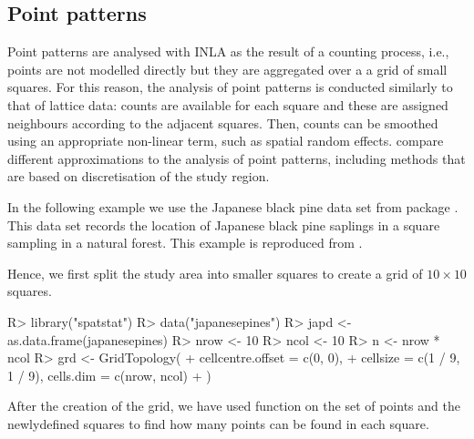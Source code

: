 \documentclass[article]{jss}
\begin{document}
\subsection{Point patterns}

Point patterns are analysed with INLA as the result of a counting process,
i.e., points are not modelled directly but they are aggregated over a a grid
of small squares. For this reason, the analysis of point patterns is conducted
similarly to that of lattice data: counts are available for each square and 
these are assigned neighbours according to the adjacent squares. Then, counts
can be smoothed using an appropriate non-linear term, such as spatial
random effects. \citet{HossainLawson:2009} compare different approximations
to the analysis of point patterns, including methods that are based on discretisation of the study region.

In the following example we use the Japanese black pine data set from
 package  \citep{spatstat:2005}. This data set records the location of
Japanese black pine saplings in a square sampling in a natural forest.  This
example is reproduced from \citet{GomezRubioetal:2013}.

Hence, we first split the study area into smaller squares to create a
grid of $10\times 10$ squares.

\begin{Schunk}
\begin{Sinput}
R> library("spatstat")
R> data("japanesepines")
R> japd <- as.data.frame(japanesepines)
R> nrow <- 10
R> ncol <- 10
R> n <- nrow * ncol
R> grd <- GridTopology(
+     cellcentre.offset = c(0, 0),
+     cellsize = c(1 / 9, 1 / 9), cells.dim = c(nrow, ncol)
+  )
\end{Sinput}
\end{Schunk}


After the creation of the grid, we have used function  on
the set of points and the newlydefined squares to find how many points can be
found in each square.

\begin{Schunk}
\end{Schunk}
\end{document}
